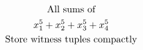 \documentclass[preview]{standalone}
\begin{document}
\begin{gather*}
\special{dvisvgm:raw <g id='unique000'>}\text{All sums of} \\ x_1^5 + x_2^5 + x_3^5 + x_4^5 \\ \text{Store witness tuples compactly}\special{dvisvgm:raw </g>}
\end{gather*}
\end{document}
